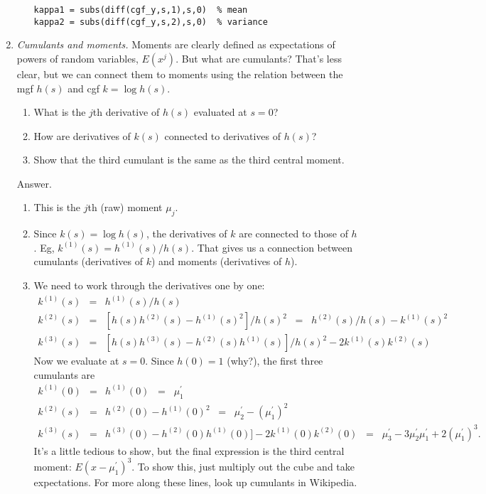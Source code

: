 \documentclass[11pt]{article}
\begin{document}
\begin{enumerate}
\begin{enumerate}
\begin{verbatim}
kappa1 = subs(diff(cgf_y,s,1),s,0)  % mean
kappa2 = subs(diff(cgf_y,s,2),s,0)  % variance
\end{verbatim}
\end{enumerate}

\item {\it Cumulants and moments.\/}
Moments are clearly defined as expectations of powers of random variables, $E(x^j)$.
But what are cumulants?
That's less clear, but we can connect them to moments using the relation
between the mgf $h(s)$ and cgf $k = \log h(s)$.
\begin{enumerate}
\item What is the $j$th derivative of $h(s)$ evaluated at $s=0$?
\item How are derivatives of $k(s)$ connected to derivatives of $h(s)$?
\item Show that the third cumulant is the same as the third central moment.
\end{enumerate}
%
Answer.
\begin{enumerate}
\item This is the $j$th (raw) moment $\mu_j$.
\item Since $k(s) = \log h(s)$, the derivatives of $k$ are connected to those of $h$.
Eg, $k^{(1)}(s) =  h^{(1)}(s)/h(s) $.
That gives us a connection between cumulants (derivatives of $k$) and moments
(derivatives of $h$).
\item We need to work through the derivatives one by one:
\begin{eqnarray*}
    k^{(1)}(s) &=& h^{(1)}(s) / h(s)  \\
    k^{(2)}(s) &=& [h(s)h^{(2)}(s) - h^{(1)}(s)^2]/h(s)^2
            \;\;=\;\; h^{(2)}(s)/h(s) - k^{(1)}(s)^2 \\
    k^{(3)}(s) &=& [h(s)h^{(3)}(s) - h^{(2)}(s)h^{(1)}(s)]/h(s)^2 - 2 k^{(1)}(s) k^{(2)}(s)
\end{eqnarray*}
Now we evaluate at $s=0$.  Since $h(0) = 1$ (why?),
the first three cumulants are
\begin{eqnarray*}
    k^{(1)}(0) &=& h^{(1)}(0) \;\;=\;\; \mu_1^\prime  \\
    k^{(2)}(s) &=& h^{(2)}(0) - h^{(1)}(0)^2 \;\;=\;\; \mu_2^\prime - (\mu_1^\prime)^2 \\
    k^{(3)}(s) &=& h^{(3)}(0) - h^{(2)}(0)h^{(1)}(0)]
                    - 2 k^{(1)}(0) k^{(2)}(0)
               \;\;=\;\; \mu_3^\prime - 3 \mu_2^\prime \mu^\prime_1 + 2(\mu^\prime_1)^3 .
\end{eqnarray*}
It's a little tedious to show, but the final expression is the third
central moment:  $ E (x - \mu_1^\prime)^3$.
To show this, just multiply out the cube and take expectations.
For more along these lines, look up cumulants in Wikipedia.


\end{enumerate}
\end{enumerate}
\end{document}
